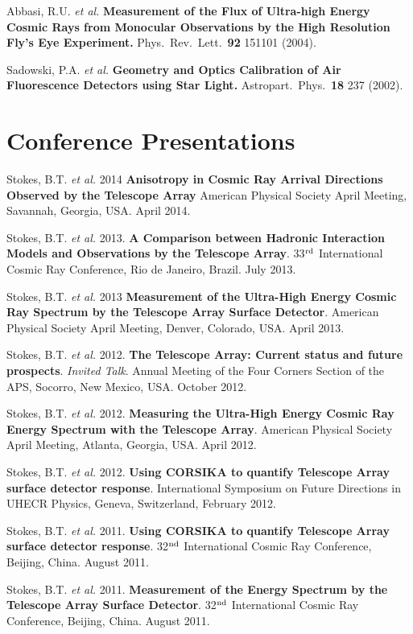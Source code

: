 \begin{resume}
Abbasi, R.U. {\it et al.}  {\bf Measurement of the Flux of Ultra-high Energy
Cosmic Rays from Monocular Observations by the High Resolution Fly's Eye
Experiment.}  Phys.\ Rev.\ Lett.\ {\bf 92} 151101 (2004). 

Sadowski, P.A. {\it et al.} {\bf Geometry and Optics Calibration of Air
Fluorescence Detectors using Star Light.}  Astropart.\ Phys.\ {\bf 18} 237
(2002).

\section{\sc Conference Presentations}

Stokes, B.T. {\it et al.} 2014 {\bf  Anisotropy in Cosmic Ray Arrival Directions Observed by the Telescope Array} American Physical Society April Meeting, Savannah, Georgia, USA. April 2014.

Stokes, B.T. {\it et al.} 2013. {\bf A Comparison between Hadronic Interaction Models and Observations by the Telescope Array}. 33$^{\rm rd}$ International Cosmic Ray Conference, Rio de Janeiro, Brazil. July 2013.

Stokes, B.T. {\it et al.} 2013 {\bf Measurement of the Ultra-High Energy Cosmic Ray Spectrum by the Telescope Array Surface Detector}. American Physical Society April Meeting, Denver, Colorado, USA. April 2013.

Stokes, B.T. {\it et al.} 2012. {\bf The Telescope Array: Current status and future prospects}.  {\it Invited Talk}. Annual Meeting of the Four Corners Section of the APS, Socorro, New Mexico, USA. October 2012.

Stokes, B.T. {\it et al.} 2012. {\bf Measuring the Ultra-High Energy Cosmic Ray Energy Spectrum with the Telescope Array}. American Physical Society April Meeting, Atlanta, Georgia, USA. April 2012.

Stokes, B.T. {\it et al.} 2012. {\bf Using CORSIKA to quantify Telescope
Array surface detector response}. International Symposium on Future Directions
in UHECR Physics, Geneva, Switzerland, February 2012.

Stokes, B.T. {\it et al.} 2011. {\bf Using CORSIKA to quantify Telescope
Array surface detector response}. 32$^{\rm nd}$ International Cosmic Ray
Conference, Beijing, China. August 2011.

Stokes, B.T. {\it et al.} 2011. {\bf Measurement of the Energy Spectrum by the
Telescope Array Surface Detector}. 32$^{\rm nd}$ International Cosmic Ray
Conference, Beijing, China. August 2011.


\end{resume}
